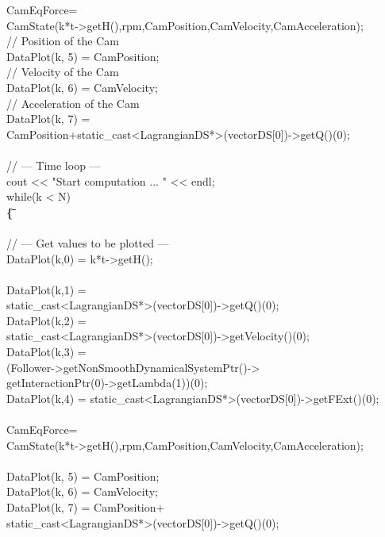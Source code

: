 \begin{tabbing}
 \>     CamEqForce=\\
 \> \> CamState(k*t->getH(),rpm,CamPosition,CamVelocity,CamAcceleration);\\
 \>     // Position of the Cam\\
 \>      DataPlot(k, 5) = CamPosition;\\
 \>      // Velocity of the Cam\\
 \>      DataPlot(k, 6) = CamVelocity;\\
 \>      // Acceleration of the Cam\\
 \>      DataPlot(k, 7) =\\
 \> \>CamPosition+static\_cast<LagrangianDS*>(vectorDS[0])->getQ()(0);\\
\\
 \> // --- Time loop ---\\
 \> cout << "Start computation ... " << endl;\\
 \> while(k < N)\\
 \>   {\bf \{ }\+ \hspace{0.5cm}\= \hspace{2cm}\= \hspace{1cm}\=\hspace{1cm}\=\hspace{1cm}\=\hspace{1cm}\=\\\\
 \> // --- Get values to be plotted ---\\
 \>     DataPlot(k,0) = k*t->getH();\\
 \\
 \>     DataPlot(k,1) = \\
 \> \> static\_cast<LagrangianDS*>(vectorDS[0])->getQ()(0);\\
 \>     DataPlot(k,2) =  \\
 \> \> static\_cast<LagrangianDS*>(vectorDS[0])->getVelocity()(0);\\
 \>     DataPlot(k,3) =  \\
 \> \> (Follower->getNonSmoothDynamicalSystemPtr()->\\
 \> \> getInteractionPtr(0)->getLambda(1))(0);\\
 \>     DataPlot(k,4) = static\_cast<LagrangianDS*>(vectorDS[0])->getFExt()(0);\\
 \\

 \>     CamEqForce=\\
 \>  CamState(k*t->getH(),rpm,CamPosition,CamVelocity,CamAcceleration);\\
 \\
 \>      DataPlot(k, 5) = CamPosition;\\
 \>      DataPlot(k, 6) = CamVelocity;\\
 \>      DataPlot(k, 7) = CamPosition+\\
 \> \> static\_cast<LagrangianDS*>(vectorDS[0])->getQ()(0);\\


\end{tabbing}
